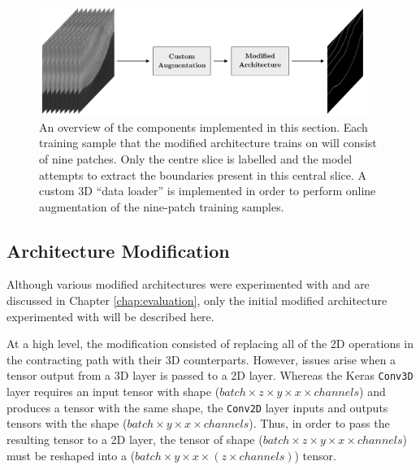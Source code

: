 \begin{figure}[t]
    \centering
    \includegraphics[width=0.95\textwidth]{images/3D-overview.pdf}
    \caption{An overview of the components implemented in this section. Each training sample that the modified architecture trains on will consist of nine patches. Only the centre slice is labelled and the model attempts to extract the boundaries present in this central slice. A custom 3D ``data loader'' is implemented in order to perform online augmentation of the nine-patch training samples.}
    \label{fig:3doverview}
\end{figure}

\subsection{Architecture Modification}

Although various modified architectures were experimented with and are discussed in Chapter \ref{chap:evaluation}, only the initial modified architecture experimented with will be described here.

At a high level, the modification consisted of replacing all of the 2D operations in the contracting path with their 3D counterparts. However, issues arise when a tensor output from a 3D layer is passed to a 2D layer. Whereas the Keras \texttt{Conv3D} layer requires an input tensor with shape ($batch \times z \times y \times x \times channels$) and produces a tensor with the same shape, the \texttt{Conv2D} layer inputs and outputs tensors with the shape ($batch \times y \times x \times channels$). Thus, in order to pass the resulting tensor to a 2D layer, the tensor of shape ($batch \times z \times y \times x \times channels$) must be reshaped into a ($batch \times y \times x \times (z \times channels)$) tensor.

